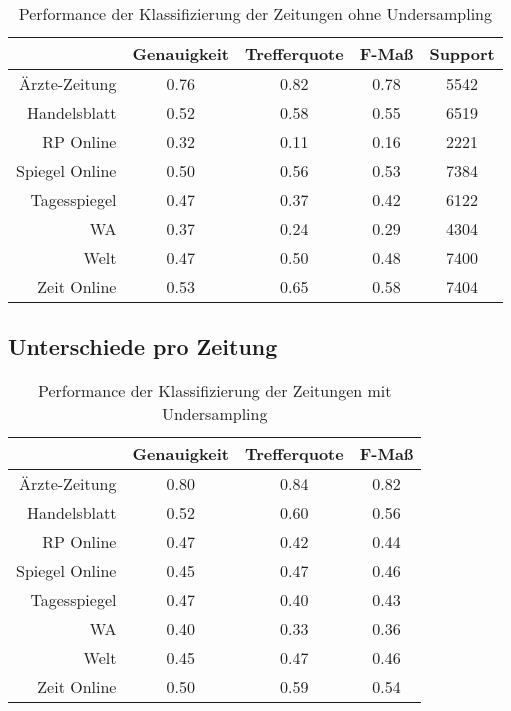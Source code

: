 \begin{table}
\centering
\begin{spacing}{1.25}
\begin{tabular}[t]{rcccc}
\toprule
~ & Genauigkeit & Trefferquote & F-Maß & Support\\
\midrule
Ärzte-Zeitung & 0.76 & 0.82 & 0.78 & 5542\\
Handelsblatt & 0.52 & 0.58 & 0.55 & 6519\\
RP Online & 0.32 & 0.11 & 0.16 & 2221\\
Spiegel Online & 0.50 & 0.56 & 0.53 & 7384\\
Tagesspiegel & 0.47 & 0.37 & 0.42 & 6122\\
WA & 0.37 & 0.24 & 0.29 & 4304\\
Welt & 0.47 & 0.50 & 0.48 & 7400\\
Zeit Online & 0.53 & 0.65 & 0.58 & 7404\\
\bottomrule
\end{tabular}
\caption{Performance der Klassifizierung der Zeitungen ohne Undersampling}
\label{table.no_undersampling_individual}
\end{spacing}
\end{table}

\subsection{Unterschiede pro Zeitung}

\begin{table}[h]
\centering
\begin{spacing}{1.25}
\begin{tabular}[t]{rccc}
\toprule
~ & Genauigkeit & Trefferquote & F-Maß\\
\midrule
Ärzte-Zeitung & 0.80 & 0.84 & 0.82\\
Handelsblatt & 0.52 & 0.60 & 0.56\\
RP Online & 0.47 & 0.42 & 0.44\\
Spiegel Online & 0.45 & 0.47 & 0.46\\
Tagesspiegel & 0.47 & 0.40 & 0.43\\
WA & 0.40 & 0.33 & 0.36\\
Welt & 0.45 & 0.47 & 0.46\\
Zeit Online & 0.50 & 0.59 & 0.54\\
\bottomrule
\end{tabular}
\caption{Performance der Klassifizierung der Zeitungen mit Undersampling}
\label{table.undersampling_individual}
\end{spacing}
\end{table}

